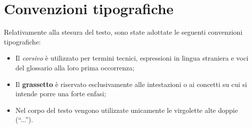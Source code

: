 \section{Convenzioni tipografiche}

\par Relativamente alla stesura del testo, sono state adottate le seguenti convenzioni tipografiche:
\begin{itemize}
	\item Il \textit{corsivo} è utilizzato per termini tecnici, espressioni in lingua straniera e voci del glossario alla loro prima occorrenza;
	\item Il \textbf{grassetto} è riservato esclusivamente alle intestazioni o ai concetti su cui si intende porre una forte enfasi;
	\item Nel corpo del testo vengono utilizzate unicamente le virgolette alte doppie (“...”).
\end{itemize}
